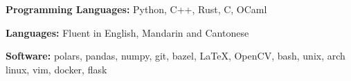 \documentclass{resume}
\begin{document}
    \begin{smalldescription}
        \item \textbf{Programming Languages:} Python, C++, Rust, C, OCaml
        \item \textbf{Languages:} Fluent in English, Mandarin and Cantonese
        \item \textbf{Software:} polars, pandas, numpy, git, bazel, \LaTeX, OpenCV, bash, unix, arch linux, vim, docker, flask
    \end{smalldescription}
\end{document}
